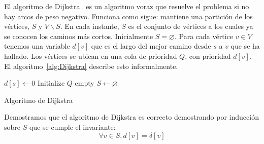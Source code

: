   El algoritmo de Dijkstra~%
    \cite{dijkstra59:_MST}
  es un algoritmo voraz
  que resuelve el problema si no hay arcos de peso negativo.
  Funciona como sigue:
  mantiene una partición de los vértices,
  \(S\) y \(V \smallsetminus S\).
  En cada instante,
  \(S\) es el conjunto de vértices
  a los cuales ya se conocen los caminos más cortos.
  Inicialmente \(S = \varnothing\).
  Para cada vértice \(v \in V\) tenemos una variable
  \(d[v]\) que es el largo del mejor camino desde \(s\) a \(v\)
  que se ha hallado.
  Los vértices se ubican en una cola de prioridad \(Q\),
  con prioridad \(d[v]\).
  El algoritmo~\ref{alg:Dijkstra} describe esto informalmente.
  \begin{algorithm}[ht]
    \DontPrintSemicolon\Indp

    \(d[s] \gets 0\) \;
    Initialize \(Q\) empty \;
    \(S \gets \varnothing\) \;
    \BlankLine
    \caption{Algoritmo de Dijkstra}
    \label{alg:Dijkstra}
  \end{algorithm}
  Demostramos que el algoritmo de Dijkstra es correcto
  demostrando por inducción sobre \(S\)
  que se cumple el invariante:
  \begin{equation}
    \label{eq:Dijkstra-invariante}
    \forall v \in S, d[v] = \delta[v]
  \end{equation}
